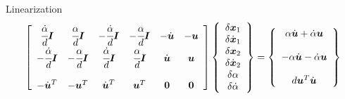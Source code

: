 \documentclass[10pt,dvips,fleqn]{report}
\newcommand{\T}[1]{\boldsymbol{#1}}
\begin{document}
Linearization
\begin{equation}
        \sqbr{\matr{cccccc}{
		\cfrac{\dot{\alpha}}{d}\T{I} & \cfrac{\alpha}{d}\T{I} &
			-\cfrac{\dot{\alpha}}{d}\T{I} & -\cfrac{\alpha}{d}\T{I} &
			-\dot{\T{u}} & -\T{u} \\
		-\cfrac{\dot{\alpha}}{d}\T{I} & -\cfrac{\alpha}{d}\T{I} &
			\cfrac{\dot{\alpha}}{d}\T{I} & \cfrac{\alpha}{d}\T{I} &
			\dot{\T{u}} & \T{u} \\
		\\
		-\dot{\T{u}}^T & -\T{u}^T & \dot{\T{u}}^T & \T{u}^T & \T{0} & \T{0}
	}}\cubr{\cvvect{
		\delta\T{x}_1 \\
		\delta\dot{\T{x}}_1 \\
		\delta\T{x}_2 \\
		\delta\dot{\T{x}}_2 \\
		\delta\alpha \\
		\delta\dot{\alpha}
	}} = \cubr{\cvvect{
		\alpha \dot{\T{u}} + \dot{\alpha} \T{u} \\
		\\
		-\alpha \dot{\T{u}} - \dot{\alpha} \T{u} \\
		\\
		d \T{u}^T \dot{\T{u}}
	}}
\end{equation}
\end{document}

